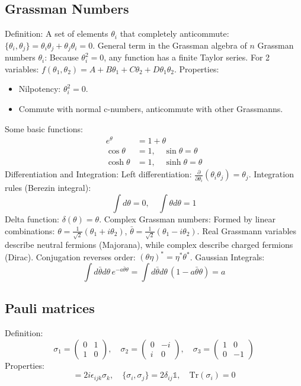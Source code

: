 \documentclass{article}
\begin{document}
\subsection{Grassman Numbers}
Definition:
A set of elements $\theta_i$ that completely anticommute: $\{\theta_i, \theta_j\} = \theta_i \theta_j + \theta_j \theta_i = 0$.
General term in the Grassman algebra of $n$ Grassman numbers $\theta_i$:
Because $\theta_i^2 = 0$, any function has a finite Taylor series. For 2 variables: $f(\theta_1, \theta_2) = A + B\theta_1 + C\theta_2 + D\theta_1\theta_2$.
\newline
Properties:
\begin{itemize}
    \item Nilpotency: $\theta_i^2 = 0$.
    \item Commute with normal c-numbers, anticommute with other Grassmanns.
\end{itemize}
Some basic functions:
\begin{align}
    e^\theta &= 1 + \theta \\
    \cos\theta &= 1, \quad \sin\theta = \theta \\
    \cosh\theta &= 1, \quad \sinh\theta = \theta
\end{align}
Differentiation and Integration:
Left differentiation: $\frac{\partial}{\partial \theta_i} (\theta_i \theta_j) = \theta_j$.
Integration rules (Berezin integral):
\begin{equation}
    \int d\theta = 0, \quad \int \theta d\theta = 1
\end{equation}
Delta function:
$\delta(\theta) = \theta$.
Complex Grassman numbers:
Formed by linear combinations: $\theta = \frac{1}{\sqrt{2}}(\theta_1 + i\theta_2)$, $\bar{\theta} = \frac{1}{\sqrt{2}}(\theta_1 - i\theta_2)$. Real Grassmann variables describe neutral fermions (Majorana), while complex describe charged fermions (Dirac). Conjugation reverses order: $(\theta \eta)^* = \eta^* \theta^*$.
Gaussian Integrals:
\begin{equation}
    \int d\bar{\theta} d\theta \, e^{-a\bar{\theta}\theta} = \int d\bar{\theta} d\theta \, (1 - a\bar{\theta}\theta) = a
\end{equation}
\subsection{Pauli matrices}
Definition:
\begin{equation}
    \sigma_1 = \begin{pmatrix} 0 & 1 \\ 1 & 0 \end{pmatrix}, \quad \sigma_2 = \begin{pmatrix} 0 & -i \\ i & 0 \end{pmatrix}, \quad \sigma_3 = \begin{pmatrix} 1 & 0 \\ 0 & -1 \end{pmatrix}
\end{equation}
Properties:
\begin{equation}
    [\sigma_i, \sigma_j] = 2i\epsilon_{ijk}\sigma_k, \quad \{\sigma_i, \sigma_j\} = 2\delta_{ij}\mathbb{1}, \quad \text{Tr}(\sigma_i) = 0
\end{equation}
\end{document}

